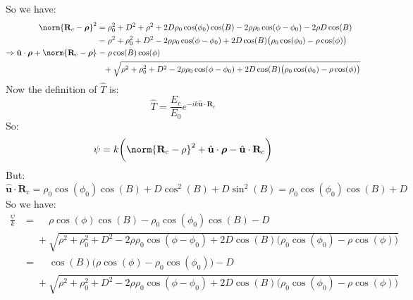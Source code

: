 \documentclass[crop=false,class=article,oneside]{standalone}
\begin{document}
            So we have:
            \begin{align*}
                \norm{\mathbf{R}_{c}-\boldsymbol{\rho}}^{2}
                &=
                \rho_{0}^{2}+D^{2}+
                \rho^{2}+2D\rho_{0}\cos(\phi_{0})\cos(B)-
                2\rho\rho_{0}\cos(\phi-\phi_{0})-2\rho D\cos(B)\\
                &=
                \rho^2+\rho_{0}^2+D^2-
                2\rho\rho_{0}\cos(\phi-\phi_{0})
                + 2D\cos(B)\big(\rho_{0}\cos(\phi_0)-
                \rho\cos(\phi)\big)\\
                \Rightarrow
                \hat{\mathbf{u}}\cdot\boldsymbol{\rho}+
                \norm{\mathbf{R}_{c}-\boldsymbol{\rho}}
                &=\rho\cos(B)\cos(\phi)\\
                &\phantom{=}+
                \sqrt{\rho^2+\rho_{0}^2+D^2-
                      2\rho\rho_{0}\cos(\phi - \phi_{0})+
                      2D\cos(B)\big(\rho_{0}\cos(\phi_0)-
                      \rho\cos(\phi)\big)}
            \end{align*}
            Now the definition of $\hat{T}$ is:
            \begin{equation*}
            \hat{T} = \frac{E_{c}}{E_{0}}e^{-ik\hat{\mathbf{u}}\cdot\mathbf{R}_{c}}
            \end{equation*}
            So:
            \begin{equation*}
            \psi = k\bigg(\norm{\mathbf{R}_{c}-\rho}^2 + \hat{\mathbf{u}}\cdot\boldsymbol{\rho} - \hat{\mathbf{u}}\cdot \mathbf{R}_{c}\bigg)    
            \end{equation*}
            But:
            \begin{equation*}
            \hat{\mathbf{u}}\cdot \mathbf{R}_{c} = \rho_{0}\cos(\phi_0)\cos(B) + D\cos^2(B) + D\sin^2(B) = \rho_{0}\cos(\phi_0)\cos(B)+D    
            \end{equation*}
            So we have:
            \begin{align*}
            \frac{\psi}{k} &=\phantom{+}\rho\cos(\phi)\cos(B) - \rho_0\cos(\phi_0)\cos(B)-D\\
            &\phantom{=}+\sqrt{\rho^2+\rho_{0}^2 + D^2 - 2\rho\rho_{0}\cos(\phi - \phi_{0}) + 2D\cos(B)\big(\rho_{0}\cos(\phi_0) - \rho\cos(\phi)\big)} \\
            &=\phantom{+}\cos(B)\big(\rho\cos(\phi) - \rho_{0}\cos(\phi_{0})\big) - D\\
            &\phantom{=}+\sqrt{\rho^2+\rho_{0}^2 + D^2 - 2\rho\rho_{0}\cos(\phi - \phi_{0}) + 2D\cos(B)\big(\rho_{0}\cos(\phi_0) - \rho\cos(\phi)\big)}
            \end{align*}
\end{document}

